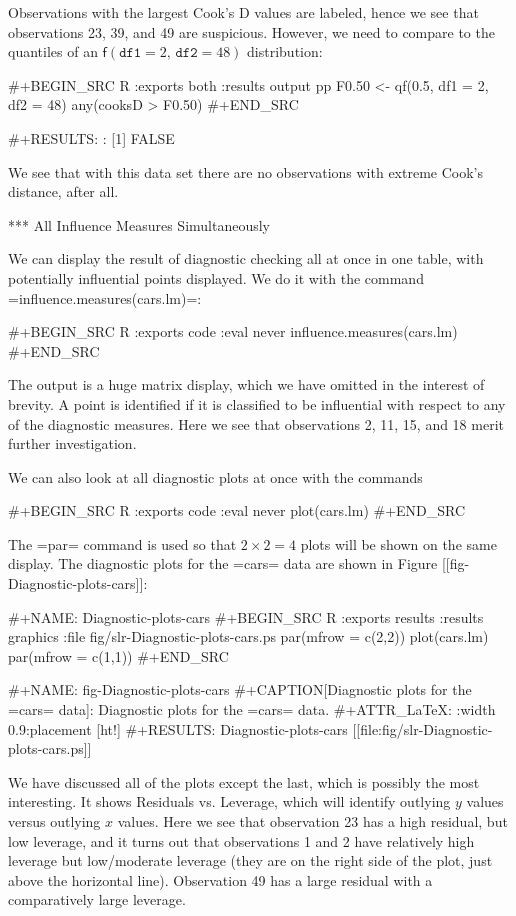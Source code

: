 Observations with the largest Cook's D values are labeled, hence we
see that observations 23, 39, and 49 are suspicious. However, we need
to compare to the quantiles of an \( \mathsf{f}(\mathtt{df1} = 2, \,
\mathtt{df2} = 48) \) distribution:

#+BEGIN_SRC R :exports both :results output pp 
F0.50 <- qf(0.5, df1 = 2, df2 = 48)
any(cooksD > F0.50)
#+END_SRC

#+RESULTS:
: [1] FALSE

We see that with this data set there are no observations with extreme
Cook's distance, after all.

*** All Influence Measures Simultaneously

We can display the result of diagnostic checking all at once in one
table, with potentially influential points displayed. We do it with
the command =influence.measures(cars.lm)=:

#+BEGIN_SRC R :exports code :eval never
influence.measures(cars.lm)
#+END_SRC

The output is a huge matrix display, which we have omitted in the
interest of brevity. A point is identified if it is classified to be
influential with respect to any of the diagnostic measures. Here we
see that observations 2, 11, 15, and 18 merit further investigation.

We can also look at all diagnostic plots at once with the commands

#+BEGIN_SRC R :exports code :eval never
plot(cars.lm)
#+END_SRC

The =par= command is used so that \(2\times 2 = 4\) plots will be
shown on the same display. The diagnostic plots for the =cars= data
are shown in Figure [[fig-Diagnostic-plots-cars]]:

#+NAME: Diagnostic-plots-cars
#+BEGIN_SRC R :exports results :results graphics :file fig/slr-Diagnostic-plots-cars.ps
par(mfrow = c(2,2))
plot(cars.lm)
par(mfrow = c(1,1))
#+END_SRC

#+NAME: fig-Diagnostic-plots-cars
#+CAPTION[Diagnostic plots for the =cars= data]: \small Diagnostic plots for the =cars= data.
#+ATTR_LaTeX: :width 0.9\textwidth :placement [ht!]
#+RESULTS: Diagnostic-plots-cars
[[file:fig/slr-Diagnostic-plots-cars.ps]]

We have discussed all of the plots except the last, which is possibly
the most interesting. It shows Residuals vs. Leverage, which will
identify outlying \(y\) values versus outlying \(x\) values. Here we
see that observation 23 has a high residual, but low leverage, and it
turns out that observations 1 and 2 have relatively high leverage but
low/moderate leverage (they are on the right side of the plot, just
above the horizontal line). Observation 49 has a large residual with a
comparatively large leverage.

